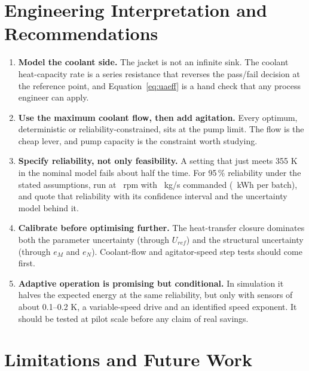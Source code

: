 \documentclass[11pt,letterpaper]{article}
\begin{document}
\begin{table}[H]
\centering
\caption{Isolated effect of the jacket thermal inventory.}\label{tab:inventory}
{\small}
\end{table}

\section{Engineering Interpretation and Recommendations}

\begin{enumerate}[leftmargin=*]
\item \textbf{Model the coolant side.} The jacket is not an infinite sink. The coolant heat-capacity rate is a series resistance that reverses the pass/fail decision at the reference point, and Equation~\ref{eq:uaeff} is a hand check that any process engineer can apply.
\item \textbf{Use the maximum coolant flow, then add agitation.} Every optimum, deterministic or reliability-constrained, sits at the pump limit. The flow is the cheap lever, and pump capacity is the constraint worth studying.
\item \textbf{Specify reliability, not only feasibility.} A setting that just meets 355 K in the nominal model fails about half the time. For 95\,\% reliability under the stated assumptions, run at \vRecRpm\ rpm with \vRecM\ kg/s commanded (\vRecE\ kWh per batch), and quote that reliability with its confidence interval and the uncertainty model behind it.
\item \textbf{Calibrate before optimising further.} The heat-transfer closure dominates both the parameter uncertainty (through \(U_{ref}\)) and the structural uncertainty (through \(e_M\) and \(e_N\)). Coolant-flow and agitator-speed step tests should come first.
\item \textbf{Adaptive operation is promising but conditional.} In simulation it halves the expected energy at the same reliability, but only with sensors of about 0.1--0.2 K, a variable-speed drive and an identified speed exponent. It should be tested at pilot scale before any claim of real savings.
\end{enumerate}

\section{Limitations and Future Work}
\end{document}
